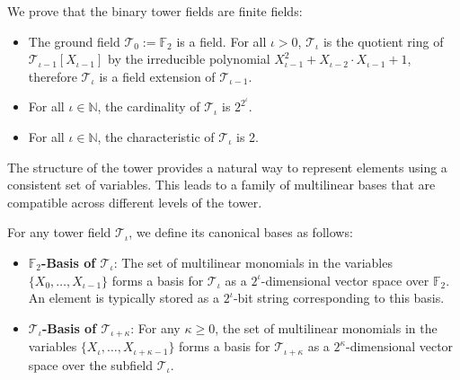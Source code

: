 \begin{theorem}
  \leanok
  We prove that the binary tower fields are finite fields:
  \label{thm:binary_tower_fields_are_fields}
    \begin{itemize}
      \item The ground field $\mathcal{T}_{0} := \mathbb{F}_2$ is a field. For all $\iota > 0$, $\mathcal{T}_{\iota}$ is the quotient ring of $\mathcal{T}_{\iota-1}[X_{\iota-1}]$ by the irreducible polynomial $X_{\iota-1}^{2}+X_{\iota-2} \cdot X_{\iota-1}+1$, therefore $\mathcal{T}_{\iota}$ is a field extension of $\mathcal{T}_{\iota-1}$.
      \item For all $\iota \in \mathbb{N}$, the cardinality of $\mathcal{T}_{\iota}$ is $2^{2^{\iota}}$.
      \item For all $\iota \in \mathbb{N}$, the characteristic of $\mathcal{T}_{\iota}$ is 2.
    \end{itemize}
\end{theorem}

The structure of the tower provides a natural way to represent elements using a consistent set of variables. This leads to a family of multilinear bases that are compatible across different levels of the tower.

\begin{definition}
    \label{def:multilinear_basis}
    For any tower field $\mathcal{T}_\iota$, we define its canonical bases as follows:
    \begin{itemize}
        \item \textbf{$\mathbb{F}_2$-Basis of $\mathcal{T}_\iota$}: The set of multilinear monomials in the variables $\{X_0, \dots, X_{\iota-1}\}$ forms a basis for $\mathcal{T}_\iota$ as a $2^\iota$-dimensional vector space over $\mathbb{F}_2$. An element is typically stored as a $2^\iota$-bit string corresponding to this basis.
        \item \textbf{$\mathcal{T}_\iota$-Basis of $\mathcal{T}_{\iota+\kappa}$}: For any $\kappa \ge 0$, the set of multilinear monomials in the variables $\{X_\iota, \dots, X_{\iota+\kappa-1}\}$ forms a basis for $\mathcal{T}_{\iota+\kappa}$ as a $2^\kappa$-dimensional vector space over the subfield $\mathcal{T}_\iota$.
    \end{itemize}
\end{definition}

